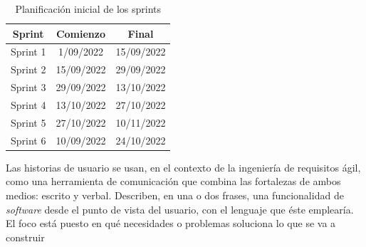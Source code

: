 \begin{table}[!h]
	\begin{center}
		\begin{tabular}{|c|c|c|}
		\hline \textbf{Sprint} & \textbf{Comienzo} & \textbf{Final}\\ 
		\hline Sprint 1 & 1/09/2022  & 15/09/2022\\ 
		\hline Sprint 2 & 15/09/2022 & 29/09/2022\\ 
		\hline Sprint 3 & 29/09/2022 & 13/10/2022\\ 
		\hline Sprint 4 & 13/10/2022 & 27/10/2022\\ 
		\hline Sprint 5 & 27/10/2022 & 10/11/2022\\ 
		\hline Sprint 6 & 10/09/2022 & 24/10/2022\\ 
		\hline 
		\end{tabular}
		\caption{Planificación inicial de los sprints}
		\label{tab:sprints}
	\end{center}
\end{table}


Las historias de usuario se usan, en el contexto de la ingeniería de requisitos ágil, como una herramienta de comunicación que combina las fortalezas de ambos medios: escrito y verbal. Describen, en una o dos frases, una funcionalidad de \textit{software} desde el punto de vista del usuario, con el lenguaje que éste emplearía. El foco está puesto en qué necesidades o problemas soluciona lo que se va a construir

